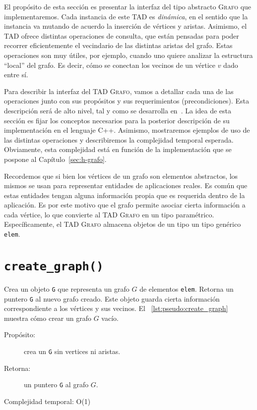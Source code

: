 \documentclass[%
    a4paper,%
    12pt,%
    twoside,%
    openright,%
    halfparskip,%
    cleardoubleempty,%
    bigheadings,%
    titlepage,%
    headsepline%
]{scrbook}
\makeatletter
\newcommand{\Grafo}{\textsc{Grafo}\xspace}
\newcommand{\Code}[1]{\lstinline[basicstyle={\tt}]@#1@}
\makeatother
\begin{document}
El propósito de esta sección es presentar la interfaz del tipo abstracto \Grafo que implementaremos.  Cada instancia de este TAD es \emph{dinámica}, en el sentido que la instancia va mutando de acuerdo la inserción de vértices y aristas.  Asimismo, el TAD ofrece distintas operaciones de consulta, que están pensadas para poder recorrer eficientemente el vecindario de las distintas aristas del grafo.  Estas operaciones son muy útiles, por ejemplo, cuando uno quiere analizar la estructura ``local'' del grafo.  Es decir, cómo se conectan los vecinos de un vértice $v$ dado entre sí.  

Para describir la interfaz del TAD \Grafo, vamos a detallar cada una de las operaciones junto con sus propósitos y sus requerimientos (precondiciones).  Esta descripción será de alto nivel, tal y como se desarrolla en~\cite{LinSoulignacSzwarcfiterTCS2012}.  La idea de esta sección es fijar los conceptos necesarios para la posterior descripción de su implementación en el lenguaje C++.  Asimismo, mostraremos ejemplos  de uso de las distintas operaciones y describiremos la complejidad temporal esperada.  Obviamente, esta complejidad está en función de la implementación que se pospone al Capítulo~\ref{sec:h-grafo}.  
%
%

Recordemos que si bien los vértices de un grafo son elementos abstractos, los mismos se usan para representar entidades de aplicaciones reales.  Es común que estas entidades tengan alguna información propia que es requerida dentro de la aplicación.  Es por este motivo que el grafo permite asociar cierta información a cada vértice, lo que convierte al TAD \Grafo en un tipo paramétrico.  Específicamente, el TAD \Grafo almacena objetos de un tipo un tipo genérico \texttt{elem}.

\section{\texttt{create\_graph()}}
\label{sec:tad grafo:create-graph}

Crea un objeto \Code{G} que representa un grafo $G$ de elementos \Code{elem}. Retorna un puntero \Code{G} al nuevo grafo creado. Este objeto guarda cierta información correspondiente a los vértices y sus vecinos. El \lstlistingname~\ref{lst:pseudo:create_graph} muestra cómo crear un grafo $G$ vacío.


\begin{description}
  \item [Propósito:] crea un \Code{G} sin vertices ni aristas.
  \item [Retorna:] un puntero \Code{G} al grafo $G$.
  \item [Complejidad temporal: O(1)]
\end{description}
\end{document}
